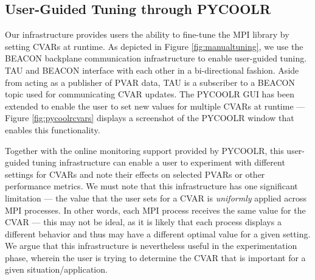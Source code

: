 \subsection {User-Guided Tuning through PYCOOLR} Our infrastructure provides users the ability to fine-tune the MPI library by setting CVARs at runtime. As depicted in Figure \ref{fig:manualtuning}, we use the BEACON backplane communication infrastructure to enable user-guided tuning. TAU and BEACON interface with each other in a bi-directional fashion. Aside from acting as a publisher of PVAR data, TAU is a subscriber to a BEACON topic used for communicating CVAR updates. The PYCOOLR GUI has been extended to enable the user to set new values for multiple CVARs at runtime --- Figure \ref{fig:pycoolrcvars} displays a screenshot of the PYCOOLR window that enables this functionality.
\par Together with the online monitoring support provided by PYCOOLR, this user-guided tuning infrastructure can enable a user to experiment with different settings for CVARs and note their effects on selected PVARs or other performance metrics. We must note that this infrastructure has one significant limitation --- the value that the user sets for a CVAR is \textit{uniformly} applied across MPI processes. In other words, each MPI process receives the same value for the CVAR --- this may not be ideal, as it is likely that each process displays a different behavior and thus may have a different optimal value for a given setting. We argue that this infrastructure is nevertheless useful in the experimentation phase, wherein the user is trying to determine the CVAR that is important for a given situation/application.

